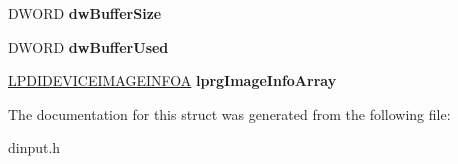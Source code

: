 \begin{DoxyCompactItemize}
\item 
\hypertarget{struct___d_i_d_e_v_i_c_e_i_m_a_g_e_i_n_f_o_h_e_a_d_e_r_a_a6fd8e16ec9292b44a81ff9c52cfd0973}{D\-W\-O\-R\-D {\bfseries dw\-Buffer\-Size}}\label{struct___d_i_d_e_v_i_c_e_i_m_a_g_e_i_n_f_o_h_e_a_d_e_r_a_a6fd8e16ec9292b44a81ff9c52cfd0973}

\item 
\hypertarget{struct___d_i_d_e_v_i_c_e_i_m_a_g_e_i_n_f_o_h_e_a_d_e_r_a_accc85427b911fabece16f02a1f2ec05d}{D\-W\-O\-R\-D {\bfseries dw\-Buffer\-Used}}\label{struct___d_i_d_e_v_i_c_e_i_m_a_g_e_i_n_f_o_h_e_a_d_e_r_a_accc85427b911fabece16f02a1f2ec05d}

\item 
\hypertarget{struct___d_i_d_e_v_i_c_e_i_m_a_g_e_i_n_f_o_h_e_a_d_e_r_a_ab24e492dd635df1e94bedc9a62227c02}{\hyperlink{struct___d_i_d_e_v_i_c_e_i_m_a_g_e_i_n_f_o_a}{L\-P\-D\-I\-D\-E\-V\-I\-C\-E\-I\-M\-A\-G\-E\-I\-N\-F\-O\-A} {\bfseries lprg\-Image\-Info\-Array}}\label{struct___d_i_d_e_v_i_c_e_i_m_a_g_e_i_n_f_o_h_e_a_d_e_r_a_ab24e492dd635df1e94bedc9a62227c02}

\end{DoxyCompactItemize}


The documentation for this struct was generated from the following file\-:\begin{DoxyCompactItemize}
\item 
dinput.\-h\end{DoxyCompactItemize}
